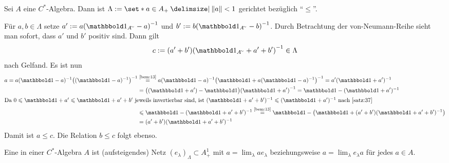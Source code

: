\begin{lemma}[label=lem:311,{name=[gerichtete Menge in einer $C^*$-Algebra]}]
	Sei $A$ eine $C^*$-Algebra. Dann ist $\Lambda := \set*{a \in A_+ \given \norm*{a} < 1}$ gerichtet bezüglich \enquote{$\le$}.
\end{lemma}
\begin{beweis}
	Für $a,b \in \Lambda$ setze $a' := a \enbrace*{\ind_{A^\simm}-a}^{-1}$ und $b' := b \enbrace*{\ind_{A^\simm} -b}^{-1}$. 
	Durch Betrachtung der von-Neumann-Reihe sieht man sofort, dass $a'$ und $b'$ positiv sind.
	Dann gilt 
	\[
		c := (a' +b') \enbrace*{\ind_{A^\simm} + a' +b'}^{-1} \in \Lambda
	\]
	 nach Gelfand. Es ist nun
	 \begin{align}
	 	a=a(\ind-a)^{-1} \enbrace*{(\ind-a)^{-1}}^{-1} &\StackText{\ref{bem:13}}{=} a (\ind -a)^{-1} \enbrace*{\ind + a (\ind -a)^{-1}}^{-1} = a' (\ind+a')^{-1} \\
		&= \enbrace[\big]{(\ind +a')-\ind} \enbrace*{\ind +a'}^{-1} = \ind - (\ind +a')^{-1} \\
		\intertext{Da $0\le \ind +a' \le \ind + a' +b'$ jeweils invertierbar sind, ist $(\ind+ a'+b')^{-1} \le (\ind+a')^{-1}$ nach \autoref{satz:37}}
		&\le \ind - (\ind +a' +b')^{-1}\StackText{\ref{bem:13}}{=} \ind - \enbrace*{\ind + (a'+b')(\ind +a' +b')^{-1}} \\
		&= (a'+b')(\ind +a' +b')^{-1}
	 \end{align}
	 Damit ist $a \le c$. Die Relation $b \le c$ folgt ebenso.
\end{beweis}

\begin{definition}[{name=[approximative Eins]}]
	Eine  in einer $C^*$-Algebra $A$ ist (aufsteigendes) Netz $(e_\lambda)_\Lambda \subset A_+^1$ mit $a=\lim_\lambda a e_\lambda$ beziehungsweise 
	$a = \lim_\lambda e_\lambda a$ für jedes $a \in A$.
\end{definition}

